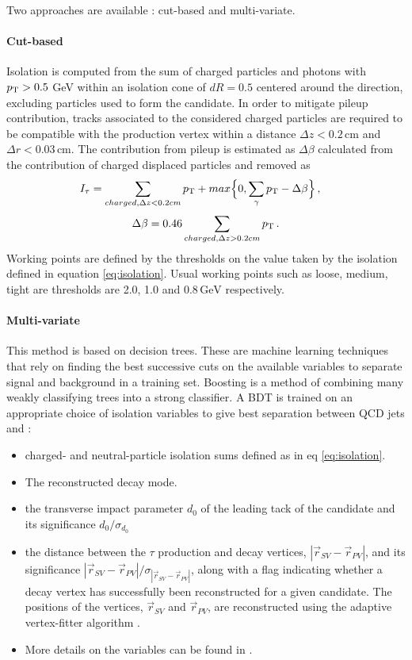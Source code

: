 Two approaches are available : cut-based and multi-variate.

\paragraph{Cut-based} Isolation is computed from the \pt sum of charged particles and photons with $p_{\mathrm{T}} > 0.5$ GeV within an isolation cone of $dR=0.5$ centered around the \tauh direction, excluding particles used to form the \tauh candidate. In order to mitigate pileup contribution, tracks associated to the considered charged particles are required to be compatible with the \tauh production vertex within a distance $\Delta z < 0.2\,\mathrm{cm}$ and $\Delta r < 0.03\,\mathrm{cm}$. The contribution from pileup is estimated as $\Delta \beta$ calculated from the contribution of charged displaced particles and removed as
\begin{equation}
    I_{\tau} = \sum_{charged, \Delta z<0.2 cm} \pt + max \Big\{ 0, \sum_{\gamma} \pt - \Delta\beta \Big\} \msep
    \label{eq:isolation}
\end{equation}
\begin{equation}
    \Delta \beta = 0.46 \sum_{charged,\Delta z>0.2 cm} \pt \mend
\end{equation}
Working points are defined by the thresholds on the value taken by the isolation defined in equation \ref{eq:isolation}. Usual working points such as loose, medium, tight are thresholds are 2.0, 1.0 and $0.8\,\mathrm{GeV}$ respectively.

\paragraph{Multi-variate} This method is based on decision trees. These are machine learning techniques that rely on finding the best successive cuts on the available variables to separate signal and background in a training set. Boosting is a method of combining many weakly classifying trees into a strong classifier. A BDT is trained on an appropriate choice of isolation variables to give best separation between QCD jets and \tauh : 
    \begin{itemize}
        \item charged- and neutral-particle isolation sums defined as in eq \ref{eq:isolation}.
        \item The reconstructed decay mode.
        \item the transverse impact parameter $d_0$ of the leading tack of the \tauh candidate and its significance $d_0 / \sigma_{d_0}$
        \item the distance between the $\tau$ production and decay vertices, $|\Vec{r}_{SV} - \Vec{r}_{PV}|$, and its significance $|\Vec{r}_{SV} - \Vec{r}_{PV}|/\sigma_{|\Vec{r}_{SV} - \Vec{r}_{PV}|}$, along with a flag indicating whether a decay vertex has successfully been reconstructed for a given \tauh candidate. The positions of the vertices, $\Vec{r}_{SV}$ and $\Vec{r}_{PV}$, are reconstructed using the adaptive vertex-fitter algorithm \cite{Waltenberger_2007}.
        \item More details on the variables can be found in \cite{tauh_reconstruction}.
    \end{itemize}

